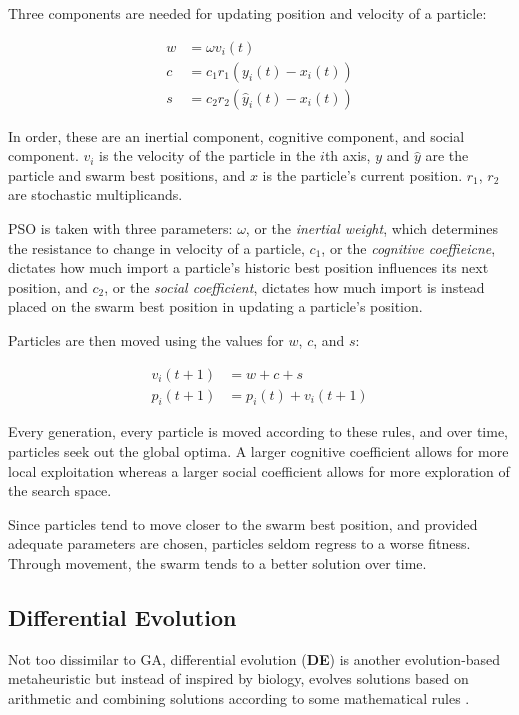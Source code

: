 \documentclass[a4paper,12pt]{article}
\begin{document}
Three components are needed for updating position and velocity of a particle:

\[
    \begin{aligned}
        w &= \omega v_i(t) \\
        c &= c_1 r_1 (y_i(t) - x_i(t)) \\
        s &= c_2 r_2 (\hat{y}_i(t) - x_i(t))
    \end{aligned}
\]

In order, these are an inertial component, cognitive component, and social component. $v_i$ is the velocity of the particle in the $i$th axis, $y$ and $\hat{y}$ are the particle and swarm best positions, and $x$ is the particle's current position. $r_1$, $r_2$ are stochastic multiplicands.

PSO is taken with three parameters: $\omega$, or the \textit{inertial weight}, which determines the resistance to change in velocity of a particle, $c_1$, or the \textit{cognitive coeffieicne}, dictates how much import a particle's historic best position influences its next position, and $c_2$, or the \textit{social coefficient}, dictates how much import is instead placed on the swarm best position in updating a particle's position.

Particles are then moved using the values for $w$, $c$, and $s$:

\[
    \begin{aligned}
        v_i(t+1) &= w + c + s \\
        p_i(t+1) &= p_i(t) + v_i(t+1)
    \end{aligned}
\]

Every generation, every particle is moved according to these rules, and over time, particles seek out the global optima. A larger cognitive coefficient allows for more local exploitation whereas a larger social coefficient allows for more exploration of the search space.

Since particles tend to move closer to the swarm best position, and provided adequate parameters are chosen, particles seldom regress to a worse fitness. Through movement, the swarm tends to a better solution over time.

\subsection{Differential Evolution}

Not too dissimilar to GA, differential evolution (\textbf{DE}) is another evolution-based metaheuristic but instead of inspired by biology, evolves solutions based on arithmetic and combining solutions according to some mathematical rules \cite{de}.
\end{document}
